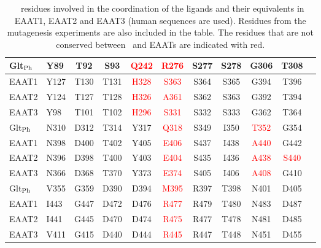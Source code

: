 \begin{table}[b!]
\caption{\GltPh\ residues involved in the coordination of the ligands
and their equivalents in EAAT1, EAAT2 and EAAT3 (human sequences are used). 
Residues from the mutagenesis experiments are also included in the table. 
The residues that are not conserved between \GltPh\ and EAATs are indicated 
with red.}
\label{review:tab2}
\begin{center}
\begin{tabular}{ l l c c c c c c c c c}
\hline
Glt$_{\rm Ph}$ 
&Y89&T92&S93&\textcolor{red}{Q242}&\textcolor{red}{R276}&S277&S278&G306&T308 \\ \hline
EAAT1 
&Y127&T130&T131&\textcolor{red}{H328}&\textcolor{red}{S363}&S364&S365&G394&T396
\\
EAAT2 
&Y124&T127&T128&\textcolor{red}{H326}&\textcolor{red}{A361}&S362&S363&G392&T394
\\
EAAT3 
&Y98&T101&T102&\textcolor{red}{H296}&\textcolor{red}{S331}&S332&S333&G362&T364
\\ \hline
Glt$_{\rm Ph}$ 
&N310&D312&T314&Y317&\textcolor{red}{Q318}&S349&I350&\textcolor{red}{T352}&G354 
\\ \hline
EAAT1 
&N398&D400&T402&Y405&\textcolor{red}{E406}&S437&I438&\textcolor{red}{A440}&G442
\\
EAAT2
&N396&D398&T400&Y403&\textcolor{red}{E404}&S435&I436&\textcolor{red}{A438}
&\textcolor{red}{S440} \\
EAAT3 
&N366&D368&T370&Y373&\textcolor{red}{E374}&S405&I406&\textcolor{red}{A408}
&G410 \\ \hline
Glt$_{\rm Ph}$  &V355&G359&D390&D394&\textcolor{red}{M395}&R397&T398&N401&D405\\ \hline
EAAT1  &I443&G447&D472&D476&\textcolor{red}{R477}&R479&T480&N483&D487 \\
EAAT2  &I441&G445&D470&D474&\textcolor{red}{R475}&R477&T478&N481&D485 \\
EAAT3  &V411&G415&D440&D444&\textcolor{red}{R445}&R447&T448&N451&D455 \\
\hline
\end{tabular}
\end{center}
\end{table}

